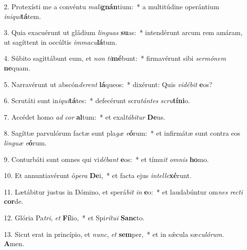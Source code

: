 2. Protexísti me a convéntu \textit{ma}\textit{li}\textbf{gnán}tium:~*  a multitúdine operántium \textit{in}\textit{i}\textit{qui}\textbf{tá}tem.\

3. Quia exacuérunt ut gládium \textit{lin}\textit{guas} \textbf{su}as:~*  intendérunt arcum rem amáram, ut sagíttent in occúltis \textit{im}\textit{ma}\textit{cu}\textbf{lá}tum.\

4. Súbito sagittábunt eum, et \textit{non} \textit{ti}\textbf{mé}bunt:~*  firmavérunt sibi \textit{ser}\textit{mó}\textit{nem} \textbf{ne}quam.\

5. Narravérunt ut abscón\textit{de}\textit{rent} \textbf{lá}queos:~*  dixérunt: Quis \textit{vi}\textit{dé}\textit{bit} \textbf{e}os?\

6. Scrutáti sunt in\textit{i}\textit{qui}\textbf{tá}tes:~*  defecérunt scru\textit{tán}\textit{tes} \textit{scru}\textbf{tí}\textbf{ni}o.\

7. Accédet homo \textit{ad} \textit{cor} \textbf{al}tum:~*  et exal\textit{tá}\textit{bi}\textit{tur} \textbf{De}us.\

8. Sagíttæ parvulórum factæ sunt pla\textit{gæ} \textit{e}\textbf{ó}rum:~*  et infirmátæ sunt contra eos \textit{lin}\textit{guæ} \textit{e}\textbf{ó}rum.\

9. Conturbáti sunt omnes qui vi\textit{dé}\textit{bant} \textbf{e}os:~*  et tímu\textit{it} \textit{om}\textit{nis} \textbf{ho}mo.\

10. Et annuntiavérunt ó\textit{pe}\textit{ra} \textbf{De}i,~*  et facta ejus \textit{in}\textit{tel}\textit{le}\textbf{xé}runt.\

11. Lætábitur justus in Dómino, et sperá\textit{bit} \textit{in} \textbf{e}o:~*  et laudabúntur om\textit{nes} \textit{rec}\textit{ti} \textbf{cor}de.\

12. Glória Pa\textit{tri}, \textit{et} \textbf{Fí}lio,~*  et Spi\textit{rí}\textit{tu}\textit{i} \textbf{Sanc}to.\

13. Sicut erat in princípio, et \textit{nunc}, \textit{et} \textbf{sem}per,~*  et in sǽcula sæ\textit{cu}\textit{ló}\textit{rum}. \textbf{A}men.\


